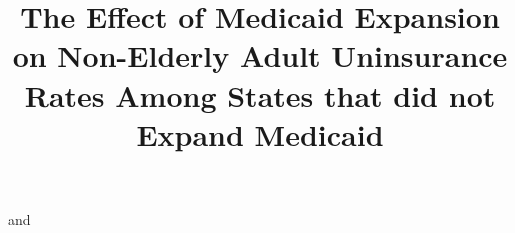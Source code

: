 \documentclass[aoas]{imsart}
\theoremstyle{plain}
\theoremstyle{remark}
\begin{document}
\begin{frontmatter}
\title{The Effect of Medicaid Expansion on Non-Elderly Adult Uninsurance Rates Among States that did not Expand Medicaid}
\runtitle{}

\begin{aug}
\author[A]{ } and
\author[A]{ }
\address[A]{Carnegie Mellon University, }

\end{aug}


\end{frontmatter}
\end{document}

